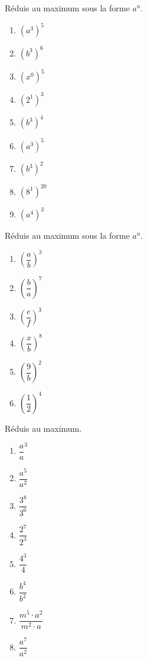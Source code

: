 \documentclass[12pt,parskip=half-, twoside=semi]{scrartcl}
\begin{document}
\begin{exercise}
  Réduis au maximum sous la forme $a^n$.
  \begin{enumerate}[cols=6]
\item \(\left( a^{3} \right)^{5} \)
\item \(\left( b^{3} \right)^{6} \)
\item \(\left( x^{0} \right)^{5} \)
\item \(\left( 2^{1} \right)^{3} \)
\item \(\left( b^{3} \right)^{4} \)
\item \(\left( a^{3} \right)^{5} \)
\item \(\left( b^{3} \right)^{2} \)
\item \(\left( 8^{1} \right)^{20} \)
\item \(\left( a^{4} \right)^{3} \)
  \end{enumerate}
\end{exercise}

\begin{exercise}
  Réduis au maximum sous la forme $a^n$.
  \begin{enumerate}[cols=6]
    \item \(\left( \dfrac{a}{b} \right)^{3} \)
    \item \(\left( \dfrac{b}{a} \right)^{7} \)
    \item \(\left( \dfrac{e}{f} \right)^{3} \)
    \item \(\left( \dfrac{x}{b} \right)^{8} \)
    \item \(\left( \dfrac{9}{b} \right)^{2} \)
    \item \(\left( \dfrac{1}{2} \right)^{4} \)
  \end{enumerate}
\end{exercise}

\begin{exercise}
  Réduis au maximum.
  \begin{enumerate}[cols=4]
    \item \(\dfrac{a}{a}^{3} \)
    \item \(\dfrac{a^{5}}{a^{2}} \)
    \item \(\dfrac{3^{8}}{3^{6}} \)
    \item \(\dfrac{2^{7}}{2^{3}} \)
    \item \(\dfrac{4^{3}}{4} \)
    \item \(\dfrac{b^{4}}{b^{2}} \)
    \item \(\dfrac{m^{5} \cdot a^{2}}{m^{2} \cdot a}\)
    \item \(\dfrac{a^{7}}{a^{2}}\)

  \end{enumerate}
\end{exercise}
\end{document}
